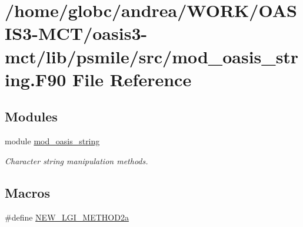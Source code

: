 \hypertarget{mod__oasis__string_8_f90}{}\section{/home/globc/andrea/\+W\+O\+R\+K/\+O\+A\+S\+I\+S3-\/\+M\+C\+T/oasis3-\/mct/lib/psmile/src/mod\+\_\+oasis\+\_\+string.F90 File Reference}
\label{mod__oasis__string_8_f90}
\subsection*{Modules}
\begin{DoxyCompactItemize}
\item 
module \hyperlink{namespacemod__oasis__string}{mod\+\_\+oasis\+\_\+string}
\begin{DoxyCompactList}\small\item\em Character string manipulation methods. \end{DoxyCompactList}\end{DoxyCompactItemize}
\subsection*{Macros}
\begin{DoxyCompactItemize}
\item 
\#define \hyperlink{mod__oasis__string_8_f90_a732dc6b61280242f5cf9c6b817dfd452}{N\+E\+W\+\_\+\+L\+G\+I\+\_\+\+M\+E\+T\+H\+O\+D2a}
\end{DoxyCompactItemize}
